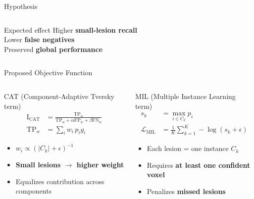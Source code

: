 \documentclass[10pt,aspectratio=169]{beamer}
\begin{document}
\begin{frame}{Hypothesis}
\begin{columns}[T,totalwidth=\textwidth]
\vspace{0.3cm}

\begin{alertblock}{Expected effect}
\small
\centering
Higher \textbf{small-lesion recall} \\
Lower \textbf{false negatives} \\
Preserved \textbf{global performance}
\end{alertblock}

\end{columns}

\end{frame}


\begin{frame}{Proposed Objective Function}

\begin{columns}[T,totalwidth=\textwidth]

\begin{block}{\centering CAT (Component-Adaptive Tversky term)}
\small
\begin{align*}
\mathrm{I}_{\mathrm{CAT}} 
&= \frac{\mathrm{TP}_w}
{\mathrm{TP}_w + \alpha \mathrm{FP}_w + \beta \mathrm{FN}_w} \\[0.2cm]
\mathrm{TP}_w &= \sum_{i} w_i \, p_i g_i
\end{align*}

\vspace{-0.2cm}
\scriptsize
\begin{itemize}
  \item $w_i \propto (|C_k| + \epsilon)^{-1}$
  \item \textbf{Small lesions $\rightarrow$ higher weight}
  \item Equalizes contribution across components
\end{itemize}
\end{block}


\begin{block}{\centering MIL (Multiple Instance Learning term)}
\small
\begin{align*}
s_k &= \max_{i \in C_k} p_i \\[0.2cm]
\mathcal{L}_{\mathrm{MIL}} 
&= \frac{1}{K}\sum_{k=1}^{K} -\log(s_k + \epsilon)
\end{align*}

\vspace{-0.2cm}
\scriptsize
\begin{itemize}
  \item Each lesion = one instance $C_k$
  \item Requires \textbf{at least one confident voxel}
  \item Penalizes \textbf{missed lesions}
\end{itemize}
\end{block}


\end{columns}
\end{frame}
\end{document}
